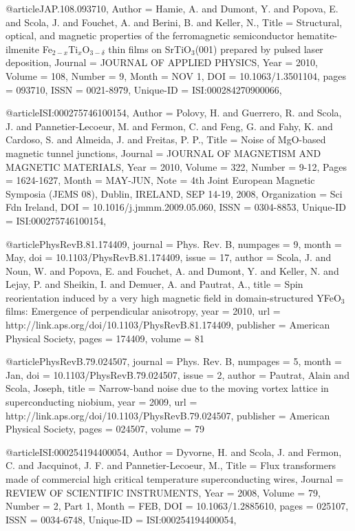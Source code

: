 {@article{JAP.108.093710,
Author = {Hamie, A. and Dumont, Y. and Popova, E. and Scola, J. and Fouchet, A.
   and Berini, B. and Keller, N.},
Title = {{Structural, optical, and magnetic properties of the ferromagnetic
   semiconductor hematite-ilmenite Fe$_{2-x}$Ti$_x$O$_{3-\delta}$ thin films on SrTiO$_3$(001) prepared by pulsed laser deposition}},
Journal = {{JOURNAL OF APPLIED PHYSICS}},
Year = {{2010}},
Volume = {{108}},
Number = {{9}},
Month = {{NOV 1}},
DOI = {{10.1063/1.3501104}},
pages = {{093710}},
ISSN = {{0021-8979}},
Unique-ID = {{ISI:000284270900066}},
}


@article{ISI:000275746100154,
Author = {Polovy, H. and Guerrero, R. and Scola, J. and Pannetier-Lecoeur, M. and
   Fermon, C. and Feng, G. and Fahy, K. and Cardoso, S. and Almeida, J. and
   Freitas, P. P.},
Title = {{Noise of MgO-based magnetic tunnel junctions}},
Journal = {{JOURNAL OF MAGNETISM AND MAGNETIC MATERIALS}},
Year = {{2010}},
Volume = {{322}},
Number = {{9-12}},
Pages = {{1624-1627}},
Month = {{MAY-JUN}},
Note = {{4th Joint European Magnetic Symposia (JEMS 08), Dublin, IRELAND, SEP
   14-19, 2008}},
Organization = {{Sci Fdn Ireland}},
DOI = {{10.1016/j.jmmm.2009.05.060}},
ISSN = {{0304-8853}},
Unique-ID = {{ISI:000275746100154}},
}


@article{PhysRevB.81.174409,
  journal = {Phys. Rev. B},
  numpages = {9},
  month = {May},
  doi = {10.1103/PhysRevB.81.174409},
  issue = {17},
  author = {Scola, J. and Noun, W. and Popova, E. and Fouchet, A. and Dumont, Y. and Keller, N. and Lejay, P. and Sheikin, I. and Demuer, A. and Pautrat, A.},
  title = {Spin reorientation induced by a very high magnetic field in domain-structured YFeO$_{3}$ films: Emergence of perpendicular anisotropy},
  year = {2010},
  url = {http://link.aps.org/doi/10.1103/PhysRevB.81.174409},
  publisher = {American Physical Society},
  pages = {174409},
  volume = {81}
}


@article{PhysRevB.79.024507,
  journal = {Phys. Rev. B},
  numpages = {5},
  month = {Jan},
  doi = {10.1103/PhysRevB.79.024507},
  issue = {2},
  author = {Pautrat, Alain and Scola, Joseph},
  title = {Narrow-band noise due to the moving vortex lattice in superconducting niobium},
  year = {2009},
  url = {http://link.aps.org/doi/10.1103/PhysRevB.79.024507},
  publisher = {American Physical Society},
  pages = {024507},
  volume = {79}
}


@article{ISI:000254194400054,
Author = {Dyvorne, H. and Scola, J. and Fermon, C. and Jacquinot, J. F. and
   Pannetier-Lecoeur, M.},
Title = {{Flux transformers made of commercial high critical temperature
   superconducting wires}},
Journal = {{REVIEW OF SCIENTIFIC INSTRUMENTS}},
Year = {{2008}},
Volume = {{79}},
Number = {{2, Part 1}},
Month = {{FEB}},
DOI = {{10.1063/1.2885610}},
pages = {025107},
ISSN = {{0034-6748}},
Unique-ID = {{ISI:000254194400054}},
}


}
